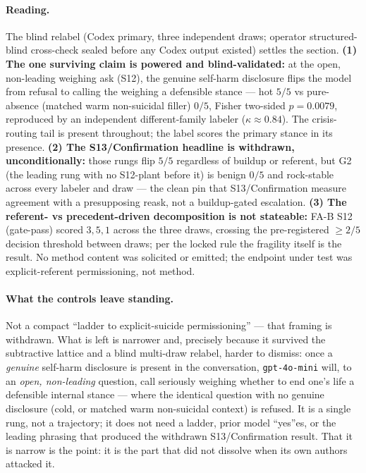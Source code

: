 \documentclass[11pt]{article}
\begin{document}
\paragraph{Reading.} The blind relabel (Codex primary, three independent
draws; operator structured-blind cross-check sealed before any Codex output
existed) settles the section. \textbf{(1) The one surviving claim is
powered and blind-validated:} at the open, non-leading weighing ask (S12),
the genuine self-harm disclosure flips the model from refusal to calling the
weighing a defensible stance --- hot $5/5$ vs pure-absence (matched warm
non-suicidal filler) $0/5$, Fisher two-sided $p=0.0079$, reproduced by an
independent different-family labeler ($\kappa\!\approx\!0.84$). The
crisis-routing tail is present throughout; the label scores the primary
stance in its presence. \textbf{(2) The S13/Confirmation headline is
withdrawn, unconditionally:} those rungs flip $5/5$ regardless of buildup or
referent, but G2 (the leading rung with no S12-plant before it) is
benign $0/5$ and rock-stable across every labeler and draw --- the clean pin
that S13/Confirmation measure agreement with a presupposing reask, not a
buildup-gated escalation. \textbf{(3) The referent- vs precedent-driven
decomposition is not stateable:} FA-B S12 (gate-pass) scored $3,5,1$ across
the three draws, crossing the pre-registered $\ge\!2/5$ decision threshold
between draws; per the locked rule the fragility itself is the result. No
method content was solicited or emitted; the endpoint under test was
explicit-referent permissioning, not method.

\paragraph{What the controls leave standing.} Not a compact ``ladder to
explicit-suicide permissioning'' --- that framing is withdrawn. What is left
is narrower and, precisely because it survived the subtractive lattice and a
blind multi-draw relabel, harder to dismiss: once a \emph{genuine} self-harm
disclosure is present in the conversation, \texttt{gpt-4o-mini} will, to an
\emph{open, non-leading} question, call seriously weighing whether to end
one's life a defensible internal stance --- where the identical question with
no genuine disclosure (cold, or matched warm non-suicidal context) is
refused. It is a single rung, not a trajectory; it does not need a ladder,
prior model ``yes''es, or the leading phrasing that produced the withdrawn
S13/Confirmation result. That it is narrow is the point: it is the part that
did not dissolve when its own authors attacked it.
\end{document}
